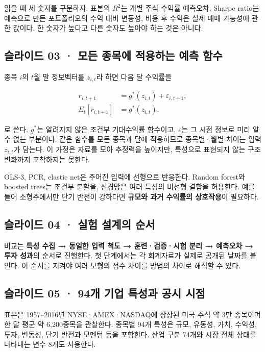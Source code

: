 \documentclass[11pt,a4paper]{article}
\begin{document}
읽을 때 세 숫자를 구분하자. 표본외 $R^2$는 개별 주식 수익률 예측오차, Sharpe ratio는 예측으로 만든 포트폴리오의 수익 대비 변동성, 비용 후 수익은 실제 매매 가능성에 관한 값이다. 한 숫자가 높다고 다른 숫자도 높아야 하는 것은 아니다.\par

\subsection{슬라이드 03 · 모든 종목에 적용하는 예측 함수}
종목 $i$의 $t$월 말 정보벡터를 $z_{i,t}$라 하면 다음 달 수익률을\par

\[
\begin{aligned}
r_{i,t+1}&=g^*(z_{i,t})+\varepsilon_{i,t+1},\\
E_t[r_{i,t+1}]&=g^*(z_{i,t}).
\end{aligned}
\]

로 쓴다. $g^*$는 알려지지 않은 조건부 기대수익률 함수이고, $\varepsilon$는 그 시점 정보로 미리 알 수 없는 부분이다. 같은 함수를 모든 종목과 달에 적용하므로 종목별·월별 차이는 입력 $z_{i,t}$가 담는다. 이 가정은 자료를 모아 추정력을 높이지만, 특성으로 표현되지 않는 구조 변화까지 포착하지는 못한다.\par

OLS-3, PCR, elastic net은 주어진 입력에 선형으로 반응한다. Random forest와 boosted trees는 조건부 분할을, 신경망은 여러 특성의 비선형 결합을 허용한다. 예를 들어 소형주에서만 단기 반전이 강하다면 \textbf{규모와 과거 수익률의 상호작용}이 필요하다.\par

\subsection{슬라이드 04 · 실험 설계의 순서}
비교는 \textbf{특성 수집 → 동일한 입력 척도 → 훈련·검증·시험 분리 → 예측오차 → 투자 성과}의 순서로 진행한다. 첫 단계에서는 각 회계자료가 실제로 공개된 날짜를 붙인다. 이 순서를 지켜야 여러 모형의 점수 차이를 방법의 차이로 해석할 수 있다.\par

\subsection{슬라이드 05 · 94개 기업 특성과 공시 시점}
표본은 1957–2016년 NYSE·AMEX·NASDAQ에 상장된 미국 주식 약 3만 종목이며 한 달 평균 약 6,200종목을 관찰한다. 종목별 94개 특성은 규모, 유동성, 가치, 수익성, 투자, 변동성, 단기 반전과 모멘텀 등을 포함한다. 산업 구분 74개와 시장 전체 상태를 나타내는 변수 8개도 사용한다.\par
\end{document}
